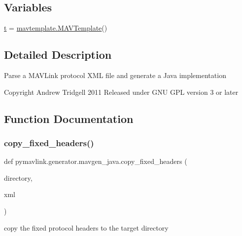 \subsection*{Variables}
\begin{DoxyCompactItemize}
\item 
\mbox{\hyperlink{namespacepymavlink_1_1generator_1_1mavgen__java_a9811e8e58e02d015df7851ec8346e896}{t}} = \mbox{\hyperlink{classpymavlink_1_1generator_1_1mavtemplate_1_1MAVTemplate}{mavtemplate.\+M\+A\+V\+Template}}()
\end{DoxyCompactItemize}


\subsection{Detailed Description}
\begin{DoxyVerb}    Parse a MAVLink protocol XML file and generate a Java implementation
    
    Copyright Andrew Tridgell 2011
    Released under GNU GPL version 3 or later\end{DoxyVerb}
 

\subsection{Function Documentation}
\mbox{\label{namespacepymavlink_1_1generator_1_1mavgen__java_ab7e11242a8e14499326d0ab7de04d9d1}} 
\subsubsection{\texorpdfstring{copy\_fixed\_headers()}{copy\_fixed\_headers()}}
{\footnotesize\ttfamily def pymavlink.\+generator.\+mavgen\+\_\+java.\+copy\+\_\+fixed\+\_\+headers (\begin{DoxyParamCaption}\item[{}]{directory,  }\item[{}]{xml }\end{DoxyParamCaption})}

\begin{DoxyVerb}copy the fixed protocol headers to the target directory\end{DoxyVerb}
 


